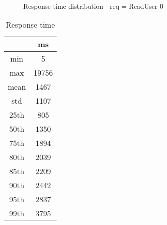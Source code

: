 \begin{minipage}{0.75\linewidth}
\begin{figure}[h]
\begin{adjustbox}{max width=1.0\linewidth, keepaspectratio}
  \end{adjustbox}
  \caption{Response time distribution - req = ReadUser-0}
\end{figure}
\end{minipage}\hfill\begin{minipage}{0.18\linewidth}
\begin{table}[h]
\begin{tabular}{|cc|}
\hline
\textbf{} & \textbf{ms}\\ \hline
 \Xhline{0.005\arrayrulewidth}
min & 5\\
 \Xhline{0.005\arrayrulewidth}
max & 19756\\
 \Xhline{0.005\arrayrulewidth}
mean & 1467\\
 \Xhline{0.005\arrayrulewidth}
std & 1107\\
\hline
\hline
 \Xhline{0.005\arrayrulewidth}
25th & 805\\
 \Xhline{0.005\arrayrulewidth}
50th & 1350\\
 \Xhline{0.005\arrayrulewidth}
75th & 1894\\
 \Xhline{0.005\arrayrulewidth}
80th & 2039\\
 \Xhline{0.005\arrayrulewidth}
85th & 2209\\
 \Xhline{0.005\arrayrulewidth}
90th & 2442\\
 \Xhline{0.005\arrayrulewidth}
95th & 2837\\
 \Xhline{0.005\arrayrulewidth}
99th & 3795\\
\hline
\end{tabular}
\caption{Response time}
\end{table}
\end{minipage}\hfill